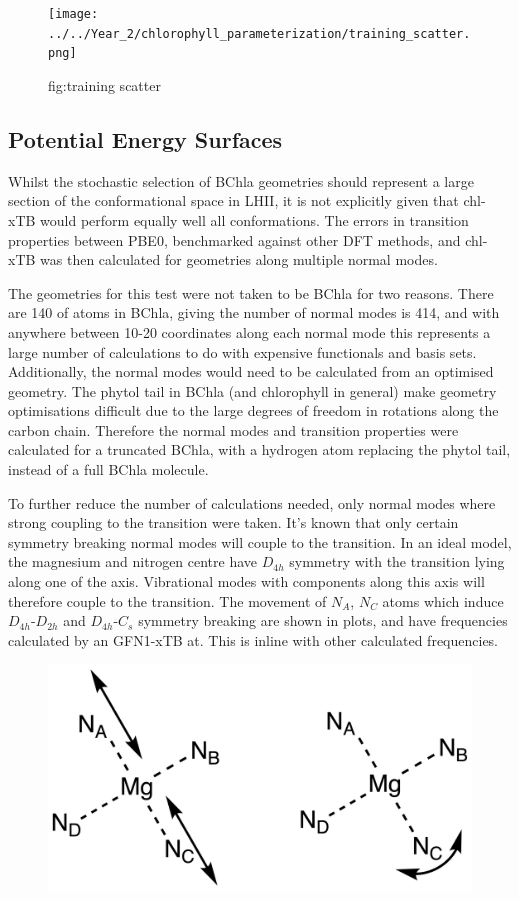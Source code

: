 \begin{figure}
    \texttt{[image: ../../Year\_2/chlorophyll\_parameterization/training\_scatter.png]}
    \caption{fig:training scatter}
\end{figure}

\subsection{Potential Energy Surfaces}
\label{subsec:pot_energy_surfaces}

Whilst the stochastic selection of BChla geometries should represent a large section 
of the conformational space in LHII, it is not explicitly given that chl-xTB would
perform equally well all conformations. The errors in transition properties between
PBE0, benchmarked against other DFT methods, and chl-xTB was then calculated for
geometries along multiple normal modes.

The geometries for this test were not taken to be BChla for two reasons. There are
140 of atoms in BChla, giving the number of normal modes is 414, and with
anywhere between 10-20 coordinates along each normal mode this represents a large
number of calculations to do with expensive functionals and basis sets. Additionally,
the normal modes would need to be calculated from an optimised geometry. The phytol
tail in BChla (and chlorophyll in general) make geometry optimisations difficult
due to the large degrees of freedom in rotations along the carbon chain. Therefore
the normal modes and transition properties were calculated for a truncated BChla, 
with a hydrogen atom replacing the phytol tail, instead of a full BChla molecule.

To further reduce the number of calculations needed, only normal modes where strong
coupling to the \Qy transition were taken. It's known that only certain symmetry 
breaking normal modes will couple to the \Qy transition.
In an ideal model, the magnesium and nitrogen centre have $D_{4h}$ symmetry with
the \Qy transition lying along one of the axis. Vibrational modes with components
along this axis will therefore couple to the transition. The movement of $N_A$, $N_C$
atoms which induce $D_{4h}$-$D_{2h}$ and $D_{4h}$-$C_{s}$ symmetry breaking are 
shown in plots, and have frequencies calculated by an GFN1-xTB at. This is inline 
with other calculated frequencies.

\begin{figure}
    \includegraphics[]{chapters/chapter03/D4h_symmetry.png}
\end{figure}

